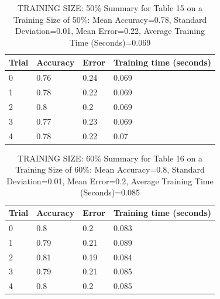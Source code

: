 \documentclass{article}
\begin{document}
\begin{table}[H]

\centering
{\begin{tabular}{||p{1cm}|p{1.8cm}|p{1.8cm}|p{3cm}||}
 \hline
Trial & Accuracy & Error & Training time (seconds) \\ [0.5ex] 
 \hline\hline
   0  & 0.76  & 0.24  & 0.069\\
\hline
   1  & 0.78  & 0.22  & 0.069\\
\hline
   2  & 0.8  & 0.2  & 0.069\\
\hline
   3  & 0.77  & 0.23  & 0.069\\
\hline
   4  & 0.78  & 0.22  & 0.07\\
\hline

\end{tabular}}
\caption{TRAINING SIZE: 50\% \newline Summary for Table 15 on a Training Size of 50\%: Mean Accuracy=0.78, Standard Deviation=0.01, Mean Error=0.22, Average Training Time (Seconds)=0.069}
\end{table} 

\begin{table}[H]

\centering
{\begin{tabular}{||p{1cm}|p{1.8cm}|p{1.8cm}|p{3cm}||}
 \hline
Trial & Accuracy & Error & Training time (seconds) \\ [0.5ex] 
 \hline\hline
   0  & 0.8  & 0.2  & 0.083\\
\hline
   1  & 0.79  & 0.21  & 0.089\\
\hline
   2  & 0.81  & 0.19  & 0.084\\
\hline
   3  & 0.79  & 0.21  & 0.085\\
\hline
   4  & 0.8  & 0.2  & 0.085\\
\hline

\end{tabular}}
\caption{TRAINING SIZE: 60\% \newline Summary for Table 16 on a Training Size of 60\%: Mean Accuracy=0.8, Standard Deviation=0.01, Mean Error=0.2, Average Training Time (Seconds)=0.085}
\end{table} 
\end{document}
